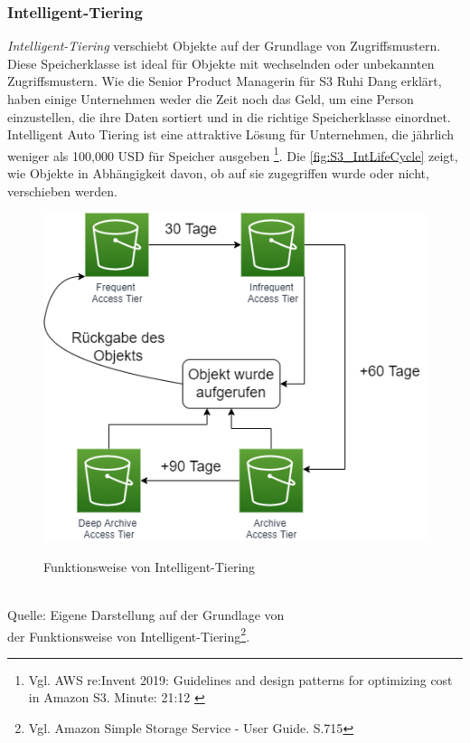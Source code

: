 \subsubsection{Intelligent-Tiering}
\textit{Intelligent-Tiering} verschiebt Objekte auf der Grundlage von Zugriffsmustern. Diese Speicherklasse ist ideal für Objekte mit wechselnden oder unbekannten Zugriffsmustern. Wie die Senior Product Managerin für S3 Ruhi Dang erklärt, haben einige Unternehmen weder die Zeit noch das Geld, um eine Person einzustellen, die ihre Daten sortiert und in die richtige Speicherklasse einordnet. Intelligent Auto Tiering ist eine attraktive Lösung für Unternehmen, die jährlich weniger als 100,000 USD für Speicher ausgeben \footnote{Vgl. AWS re:Invent 2019: Guidelines and design patterns for optimizing cost in Amazon S3. Minute: 21:12 \cite{AMZ16}}.
Die \autoref{fig:S3_IntLifeCycle} zeigt, wie Objekte in Abhängigkeit davon, ob auf sie zugegriffen wurde oder nicht, verschieben werden. 
\begin{figure}[h!]
  \centering
  \includegraphics[scale=0.7]{sources/S3_IntLifeCycle}
  \caption[Funktionsweise von Intelligent-Tiering]{}\label{fig:S3_IntLifeCycle} Funktionsweise von Intelligent-Tiering
\end{figure}\\
Quelle: Eigene Darstellung auf der Grundlage von \\
der Funktionsweise von Intelligent-Tiering\footnote{Vgl. Amazon Simple Storage Service - User Guide. S.715\cite{AMZ18}}.
